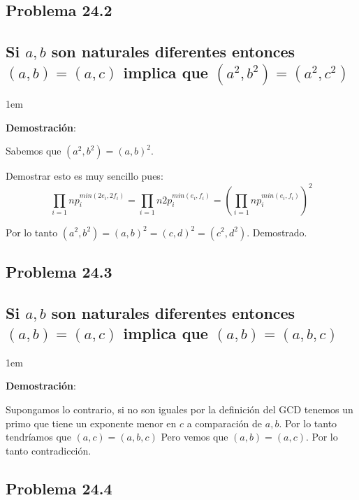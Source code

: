 \documentclass[12pt, fleqn]{article}                             %
\newenvironment{SmallIndentation}[1][0.75em]                    %
    {\begin{adjustwidth}{#1}{}\begin{footnotesize}}                 %
    {\end{footnotesize}\end{adjustwidth}}                           %
\newcommand{\Wrap}[1]{\left( #1 \right)}                        %
\begin{document}
    \subsection{Problema 24.2}
    \subsection*{Si $a,b$ son naturales diferentes entonces
    $(a,b) = (a,c)$ implica que $(a^2, b^2) = (a^2, c^2)$}

    \begin{SmallIndentation}[1em]
        \textbf{Demostración}:
        
        Sabemos que $(a^2, b^2) = (a, b)^2$.

        Demostrar esto es muy sencillo pues:
        \begin{equation*}
            \prod_{i=1}{n} p_i^{min(2e_i, 2f_i)}
            = \prod_{i=1}{n} 2p_i^{min(e_i, f_i)}   
            = \Wrap{\prod_{i=1}{n} p_i^{min(e_i, f_i)}}^2   
        \end{equation*}

        Por lo tanto $(a^2,b^2)=(a,b)^2=(c,d)^2=(c^2,d^2)$.
        Demostrado.
    
    \end{SmallIndentation}


    \subsection{Problema 24.3}
    \subsection*{Si $a,b$ son naturales diferentes entonces
    $(a,b) = (a,c)$ implica que $(a, b) = (a, b, c)$}

    \begin{SmallIndentation}[1em]
        \textbf{Demostración}:
        
        Supongamos lo contrario, si no son iguales por la definición
        del GCD tenemos un primo que tiene un exponente menor en $c$ a
        comparación de $a, b$. Por lo tanto tendríamos que $(a, c) = (a,b,c)$
        Pero vemos que $(a,b)=(a,c)$. Por lo tanto contradicción.

    
    \end{SmallIndentation}


    \clearpage
    \subsection{Problema 24.4}
\end{document}
